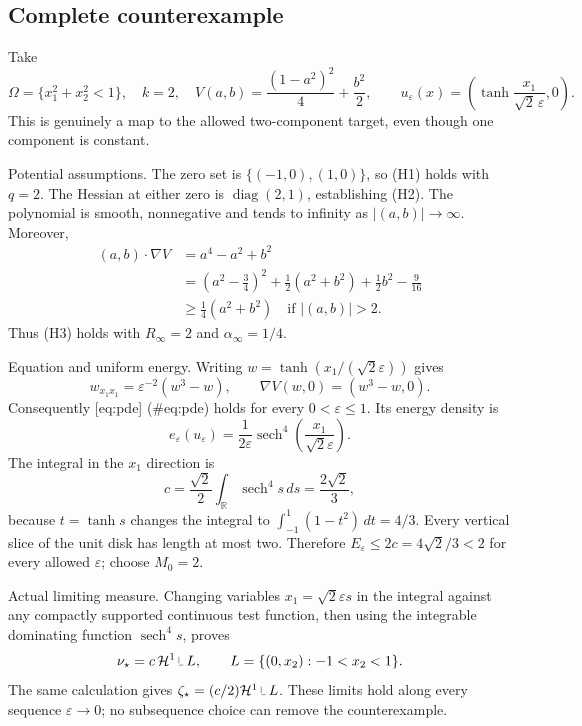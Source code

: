\documentclass[10pt]{article}
\begin{document}
\subsection*{Complete counterexample}
Take \[\Omega=\{x_1^2+x_2^2<1\},\quad k=2,\quad
 V(a,b)=\frac{(1-a^2)^2}{4}+\frac{b^2}{2},\qquad
 u_\varepsilon(x)=\left(\tanh\frac{x_1}{\sqrt2\,\varepsilon},0\right).\] This is genuinely a map to the allowed two-component target, even though one component is constant.\par
Potential assumptions. The zero set is \(\{(-1,0),(1,0)\}\), so (H1) holds with \(q=2\). The Hessian at either zero is \(\operatorname{diag}(2,1)\), establishing (H2). The polynomial is smooth, nonnegative and tends to infinity as \(|(a,b)|\to\infty\). Moreover, \[\begin{aligned}
 (a,b)\cdot\nabla V&=a^4-a^2+b^2\\
 &=(a^2-\tfrac34)^2+\tfrac12(a^2+b^2)+\tfrac12b^2-\tfrac9{16}\\
 &\ge \tfrac14(a^2+b^2)\quad\text{if }|(a,b)|>2.
\end{aligned}\] Thus (H3) holds with \(R_\infty=2\) and \(\alpha_\infty=1/4\).\par
Equation and uniform energy. Writing \(w=\tanh(x_1/(\sqrt2\varepsilon))\) gives \[w_{x_1x_1}=\varepsilon^{-2}(w^3-w),\qquad
 \nabla V(w,0)=(w^3-w,0).\] Consequently [eq:pde] (\#eq:pde) holds for every \(0<\varepsilon\le1\). Its energy density is \[e_\varepsilon(u_\varepsilon)
 =\frac1{2\varepsilon}\operatorname{sech}^4
       \left(\frac{x_1}{\sqrt2\varepsilon}\right).\] The integral in the \(x_1\) direction is \[c=\frac{\sqrt2}{2}\int_{\mathbb R}\operatorname{sech}^4 s\,ds
   =\frac{2\sqrt2}{3},\] because \(t=\tanh s\) changes the integral to \(\int_{-1}^1(1-t^2)\,dt=4/3\). Every vertical slice of the unit disk has length at most two. Therefore \(E_\varepsilon\le2c=4\sqrt2/3<2\) for every allowed \(\varepsilon\); choose \(M_0=2\).\par
Actual limiting measure. Changing variables \(x_1=\sqrt2\varepsilon s\) in the integral against any compactly supported continuous test function, then using the integrable dominating function \(\operatorname{sech}^4s\), proves \[\nu_\star=c\,\mathcal H^1\mathbin{\rule[0.3ex]{0.07ex}{1.1ex}\rule{0.7ex}{0.07ex}}L,\qquad
 L=\{(0,x_2):-1<x_2<1\}.\] The same calculation gives \(\zeta_\star=(c/2)\mathcal H^1\mathbin{\rule[0.3ex]{0.07ex}{1.1ex}\rule{0.7ex}{0.07ex}}L\). These limits hold along every sequence \(\varepsilon\to0\); no subsequence choice can remove the counterexample.\par
\end{document}
